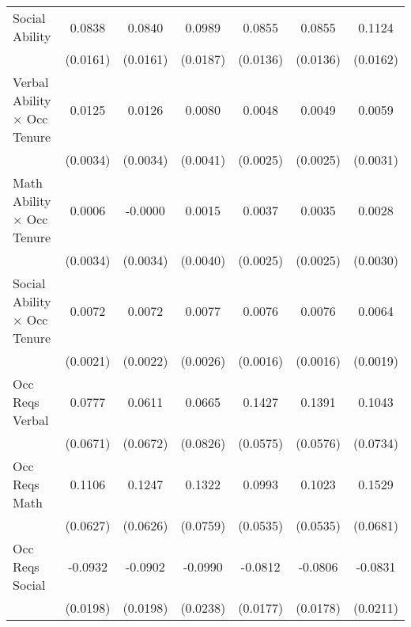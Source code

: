 {\begin{longtable}{l*{6}{c}}
Social Ability      &      0.0838\sym{***}&      0.0840\sym{***}&      0.0989\sym{***}&      0.0855\sym{***}&      0.0855\sym{***}&      0.1124\sym{***}\\
                    &    (0.0161)         &    (0.0161)         &    (0.0187)         &    (0.0136)         &    (0.0136)         &    (0.0162)         \\
Verbal Ability $\times$ Occ Tenure&      0.0125\sym{***}&      0.0126\sym{***}&      0.0080\sym{*}  &      0.0048\sym{*}  &      0.0049\sym{*}  &      0.0059\sym{*}  \\
                    &    (0.0034)         &    (0.0034)         &    (0.0041)         &    (0.0025)         &    (0.0025)         &    (0.0031)         \\
Math Ability $\times$ Occ Tenure&      0.0006         &     -0.0000         &      0.0015         &      0.0037         &      0.0035         &      0.0028         \\
                    &    (0.0034)         &    (0.0034)         &    (0.0040)         &    (0.0025)         &    (0.0025)         &    (0.0030)         \\
Social Ability $\times$ Occ Tenure&      0.0072\sym{***}&      0.0072\sym{***}&      0.0077\sym{***}&      0.0076\sym{***}&      0.0076\sym{***}&      0.0064\sym{***}\\
                    &    (0.0021)         &    (0.0022)         &    (0.0026)         &    (0.0016)         &    (0.0016)         &    (0.0019)         \\
Occ Reqs Verbal     &      0.0777         &      0.0611         &      0.0665         &      0.1427\sym{**} &      0.1391\sym{**} &      0.1043         \\
                    &    (0.0671)         &    (0.0672)         &    (0.0826)         &    (0.0575)         &    (0.0576)         &    (0.0734)         \\
Occ Reqs Math       &      0.1106\sym{*}  &      0.1247\sym{**} &      0.1322\sym{*}  &      0.0993\sym{*}  &      0.1023\sym{*}  &      0.1529\sym{**} \\
                    &    (0.0627)         &    (0.0626)         &    (0.0759)         &    (0.0535)         &    (0.0535)         &    (0.0681)         \\
Occ Reqs Social     &     -0.0932\sym{***}&     -0.0902\sym{***}&     -0.0990\sym{***}&     -0.0812\sym{***}&     -0.0806\sym{***}&     -0.0831\sym{***}\\
                    &    (0.0198)         &    (0.0198)         &    (0.0238)         &    (0.0177)         &    (0.0178)         &    (0.0211)         \\

\end{longtable}}
